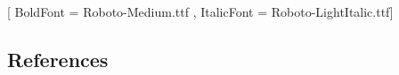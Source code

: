 \usepackage[style=verbose-ibid,backend=bibtex]{biblatex}

\usepackage{ftnxtra}
\usepackage{fnpos}
\usepackage{fontspec}
\setmainfont{Roboto-Light.ttf}[
BoldFont = Roboto-Medium.ttf ,
ItalicFont = Roboto-LightItalic.ttf]



\tableofcontents
\subsection{References}
\nocite{*} 
\printbibliography[heading=none]